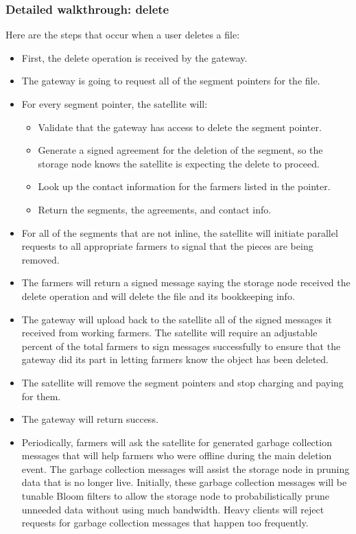 \documentclass[a4paper,10pt]{article} \usepackage[utf8]{inputenc}
\begin{document}
\subsubsection{Detailed walkthrough: delete}

Here are the steps that occur when a user deletes a file:

\begin{itemize}
\item First, the delete operation is received by the gateway.
\item The gateway is going to request all of the segment pointers for the file.
\item For every segment pointer, the satellite will:
  \begin{itemize}
  \item Validate that the gateway has access to delete the segment pointer.
  \item Generate a signed agreement for the deletion of the segment, so the
    storage node knows the satellite is expecting the delete to proceed.
  \item Look up the contact information for the farmers listed in the pointer.
  \item Return the segments, the agreements, and contact info.
  \end{itemize}
\item For all of the segments that are not inline, the satellite will
  initiate parallel requests to all appropriate farmers to signal that the
  pieces are being removed.
\item The farmers will return a signed message saying the storage node received 
the
  delete operation and will delete the file and its bookkeeping info.
\item The gateway will upload back to the satellite all of the signed
  messages it received from working farmers. The satellite will require an
  adjustable percent of the total farmers to sign messages successfully
  to ensure that the gateway did its part in letting farmers know the object
  has been deleted.
\item The satellite will remove the segment pointers and stop charging and
  paying for them.
\item The gateway will return success.
\item Periodically, farmers will ask the satellite for generated garbage
  collection messages that will help farmers who were offline during the main
  deletion event.
  The garbage collection messages will assist the storage node in pruning data 
  that is
  no longer live. Initially, these garbage collection messages will be tunable
  Bloom filters to allow the storage node to probabilistically prune unneeded 
  data
  without using much bandwidth.
  Heavy clients will reject requests for garbage collection messages that
  happen too frequently.
\end{itemize}
\end{document}

